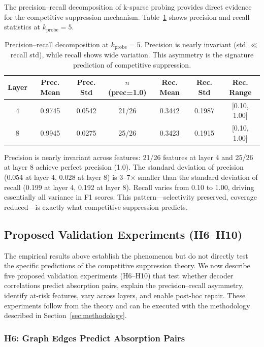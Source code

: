 \documentclass{article}
\begin{document}
The precision--recall decomposition of k-sparse probing provides direct evidence for the competitive suppression mechanism. Table~\ref{tab:precision-recall} shows precision and recall statistics at $k_{\text{probe}} = 5$.

\begin{table}[t]
\caption{Precision--recall decomposition at $k_{\text{probe}} = 5$. Precision is nearly invariant (std $\ll$ recall std), while recall shows wide variation. This asymmetry is the signature prediction of competitive suppression.}
\label{tab:precision-recall}
\centering
\small
\begin{tabular}{@{}ccccccc@{}}
\toprule
Layer & Prec. Mean & Prec. Std & $n$(prec=1.0) & Rec. Mean & Rec. Std & Rec. Range \\
\midrule
4 & 0.9745 & 0.0542 & 21/26 & 0.3442 & 0.1987 & [0.10, 1.00] \\
8 & 0.9945 & 0.0275 & 25/26 & 0.3423 & 0.1915 & [0.10, 1.00] \\
\bottomrule
\end{tabular}
\end{table}

Precision is nearly invariant across features: 21/26 features at layer 4 and 25/26 at layer 8 achieve perfect precision (1.0). The standard deviation of precision (0.054 at layer 4, 0.028 at layer 8) is 3--7$\times$ smaller than the standard deviation of recall (0.199 at layer 4, 0.192 at layer 8). Recall varies from 0.10 to 1.00, driving essentially all variance in F1 scores. This pattern---selectivity preserved, coverage reduced---is exactly what competitive suppression predicts.

\subsection{Proposed Validation Experiments (H6--H10)}
\label{sec:validation}

The empirical results above establish the phenomenon but do not directly test the specific predictions of the competitive suppression theory. We now describe five proposed validation experiments (H6--H10) that test whether decoder correlations predict absorption pairs, explain the precision--recall asymmetry, identify at-risk features, vary across layers, and enable post-hoc repair. These experiments follow from the theory and can be executed with the methodology described in Section~\ref{sec:methodology}.

\subsubsection{H6: Graph Edges Predict Absorption Pairs}
\end{document}
